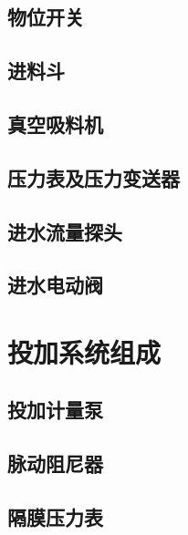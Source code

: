 \documentclass[UTF8,a4paper,12pt,titlepage]{ctexart}
\begin{document}
    \subsection{物位开关}
    
    \newpage
    
    \subsection{进料斗}
    

    \subsection{真空吸料机}
    
    \newpage

    \subsection{压力表及压力变送器}
    
    
    \subsection{进水流量探头}
    
    \newpage

    \subsection{进水电动阀}
    
    
\section{投加系统组成}
    \subsection{投加计量泵}
    

    \subsection{脉动阻尼器}
    

    \subsection{隔膜压力表}
    
    
\end{document}
